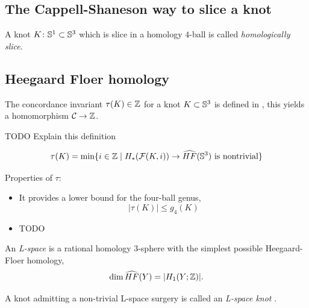\subsection{The Cappell-Shaneson way to slice a knot}

\citep[4.1]{Teichner2010}

\begin{definition}
	A knot $K \colon \mathbb{S}^{1} \subset \mathbb{S}^{3}$ which is slice in a homology $4$-ball
	is called \textit{homologically slice}.
\end{definition}


\subsection{Heegaard Floer homology}

The concordance invariant $\tau(K) \in \mathbb{Z}$ for a knot $K \subset \mathbb{S}^{3}$
is defined in \citep{ozsvath2003knot},
this yields a homomorphism $\mathcal{C} \rightarrow \mathbb{Z}$.

TODO Explain this definition
\begin{definition}
	\begin{equation*}
		\tau(K) = \min \{ i \in \mathbb{Z} \mid 
			H_{*}(\mathcal{F}(K, i))
			\rightarrow
			\widehat{HF}(\mathbb{S}^{3}) 
			\textrm{ is nontrivial} \}
	\end{equation*}
\end{definition}

Properties of $\tau$:
\begin{itemize}
	\item It provides a lower bound for the four-ball genus,
	\[
		| \tau(K) | \le g_{4}(K)
	\]
	\item TODO %
\end{itemize}


\begin{definition}
	An \textit{L-space}  is a rational homology 3-sphere
	with the simplest possible Heegaard-Floer homology,
	\begin{equation*}
		\dim \widehat{HF}(Y) = | H_{1}(Y ; \mathbb{Z}) |.
	\end{equation*}
	
	A knot admitting a non-trivial L-space surgery is
	called an \textit{L-space knot}
	.
\end{definition}

